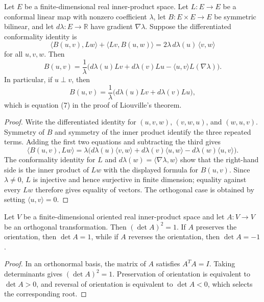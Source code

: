 \begin{lemma}
  \label{lem:dc-ch8-5-differential-core}


  Let $E$ be a finite-dimensional real inner-product space. Let $L:E\to E$ be a
  conformal linear map with nonzero coefficient $\lambda$, let $B:E\times E\to E$
  be symmetric bilinear, and let $d\lambda:E\to\mathbb R$ have gradient
  $\nabla\lambda$. Suppose the differentiated conformality identity is
  \[
    \langle B(u,v),Lw\rangle+\langle Lv,B(u,w)\rangle
      =2\lambda\,d\lambda(u)\,\langle v,w\rangle
  \]
  for all $u,v,w$. Then
  \[
    B(u,v)=\frac1\lambda\bigl(d\lambda(u)Lv+d\lambda(v)Lu
      -\langle u,v\rangle L(\nabla\lambda)\bigr).
  \]
  In particular, if $u\perp v$, then
  \[
    B(u,v)=\frac1\lambda\bigl(d\lambda(u)Lv+d\lambda(v)Lu\bigr),
  \]
  which is equation (7) in the proof of Liouville's theorem.
\end{lemma}
\begin{proof}

  Write the differentiated identity for $(u,v,w)$, $(v,w,u)$, and $(w,u,v)$.
  Symmetry of $B$ and symmetry of the inner product identify the three repeated
  terms. Adding the first two equations and subtracting the third gives
  \[
    \langle B(u,v),Lw\rangle
      =\lambda\bigl(d\lambda(u)\langle v,w\rangle
        +d\lambda(v)\langle u,w\rangle
        -d\lambda(w)\langle u,v\rangle\bigr).
  \]
  The conformality identity for $L$ and
  $d\lambda(w)=\langle\nabla\lambda,w\rangle$ show that the right-hand side
  is the inner product of $Lw$ with the displayed formula for $B(u,v)$.
  Since $\lambda\ne0$, $L$ is injective and hence surjective in finite
  dimension; equality against every $Lw$ therefore gives equality of vectors.
  The orthogonal case is obtained by setting $\langle u,v\rangle=0$.
\end{proof}

\begin{lemma}
  \label{lem:dc-ch9-3-7-orientation-det}


  Let $V$ be a finite-dimensional oriented real inner-product space and let $A:V\to V$
  be an orthogonal transformation. Then $(\det A)^2=1$. If $A$ preserves the orientation,
  then $\det A=1$, while if $A$ reverses the orientation, then $\det A=-1$.
\end{lemma}
\begin{proof}

  In an orthonormal basis, the matrix of $A$ satisfies $A^{T}A=I$. Taking determinants gives
  $(\det A)^2=1$. Preservation of orientation is equivalent to $\det A>0$, and reversal of
  orientation is equivalent to $\det A<0$, which selects the corresponding root.
\end{proof}
